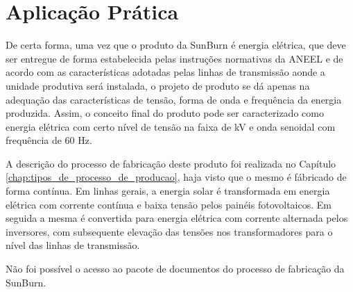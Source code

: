 \section{Aplicação Prática}
\label{sec:projeto_do_produto_aplicacao}

De certa forma, uma vez que o produto da SunBurn é energia elétrica, que deve ser entregue de forma estabelecida pelas instruções normativas da \ac{ANEEL} e de acordo com as características adotadas pelas linhas de transmissão aonde a unidade produtiva será instalada, o projeto de produto se dá apenas na adequação das características de tensão, forma de onda e frequência da energia produzida. Assim, o conceito final do produto pode ser caracterizado como energia elétrica com certo nível de tensão na faixa de kV e onda senoidal com frequência de 60 Hz.

A descrição do processo de fabricação deste produto foi realizada no Capítulo \ref{chap:tipos_de_processo_de_producao}, haja visto que o mesmo é fábricado de forma contínua. Em linhas gerais, a energia solar é transformada em energia elétrica com corrente contínua e baixa tensão pelos painéis fotovoltaicos. Em seguida a mesma é convertida para energia elétrica com corrente alternada pelos inversores, com subsequente elevação das tensões nos transformadores para o nível das linhas de transmissão.

Não foi possível o acesso ao pacote de documentos do processo de fabricação da SunBurn.
